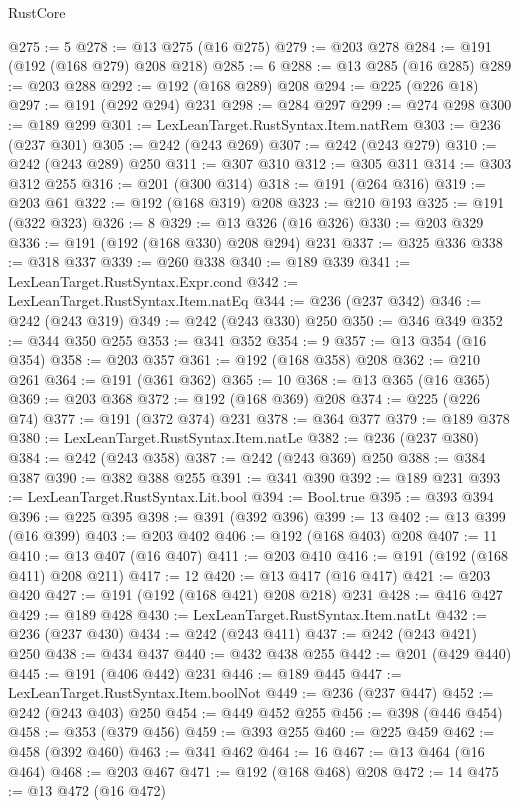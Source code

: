 \begin{lexlean}{RustCore}
\begin{coremodule}
@275 := 5
@278 := @13 @275 (@16 @275)
@279 := @203 @278
@284 := @191 (@192 (@168 @279) @208 @218)
@285 := 6
@288 := @13 @285 (@16 @285)
@289 := @203 @288
@292 := @192 (@168 @289) @208
@294 := @225 (@226 @18)
@297 := @191 (@292 @294) @231
@298 := @284 @297
@299 := @274 @298
@300 := @189 @299
@301 := LexLeanTarget.RustSyntax.Item.natRem
@303 := @236 (@237 @301)
@305 := @242 (@243 @269)
@307 := @242 (@243 @279)
@310 := @242 (@243 @289) @250
@311 := @307 @310
@312 := @305 @311
@314 := @303 @312 @255
@316 := @201 (@300 @314)
@318 := @191 (@264 @316)
@319 := @203 @61
@322 := @192 (@168 @319) @208
@323 := @210 @193
@325 := @191 (@322 @323)
@326 := 8
@329 := @13 @326 (@16 @326)
@330 := @203 @329
@336 := @191 (@192 (@168 @330) @208 @294) @231
@337 := @325 @336
@338 := @318 @337
@339 := @260 @338
@340 := @189 @339
@341 := LexLeanTarget.RustSyntax.Expr.cond
@342 := LexLeanTarget.RustSyntax.Item.natEq
@344 := @236 (@237 @342)
@346 := @242 (@243 @319)
@349 := @242 (@243 @330) @250
@350 := @346 @349
@352 := @344 @350 @255
@353 := @341 @352
@354 := 9
@357 := @13 @354 (@16 @354)
@358 := @203 @357
@361 := @192 (@168 @358) @208
@362 := @210 @261
@364 := @191 (@361 @362)
@365 := 10
@368 := @13 @365 (@16 @365)
@369 := @203 @368
@372 := @192 (@168 @369) @208
@374 := @225 (@226 @74)
@377 := @191 (@372 @374) @231
@378 := @364 @377
@379 := @189 @378
@380 := LexLeanTarget.RustSyntax.Item.natLe
@382 := @236 (@237 @380)
@384 := @242 (@243 @358)
@387 := @242 (@243 @369) @250
@388 := @384 @387
@390 := @382 @388 @255
@391 := @341 @390
@392 := @189 @231
@393 := LexLeanTarget.RustSyntax.Lit.bool
@394 := Bool.true
@395 := @393 @394
@396 := @225 @395
@398 := @391 (@392 @396)
@399 := 13
@402 := @13 @399 (@16 @399)
@403 := @203 @402
@406 := @192 (@168 @403) @208
@407 := 11
@410 := @13 @407 (@16 @407)
@411 := @203 @410
@416 := @191 (@192 (@168 @411) @208 @211)
@417 := 12
@420 := @13 @417 (@16 @417)
@421 := @203 @420
@427 := @191 (@192 (@168 @421) @208 @218) @231
@428 := @416 @427
@429 := @189 @428
@430 := LexLeanTarget.RustSyntax.Item.natLt
@432 := @236 (@237 @430)
@434 := @242 (@243 @411)
@437 := @242 (@243 @421) @250
@438 := @434 @437
@440 := @432 @438 @255
@442 := @201 (@429 @440)
@445 := @191 (@406 @442) @231
@446 := @189 @445
@447 := LexLeanTarget.RustSyntax.Item.boolNot
@449 := @236 (@237 @447)
@452 := @242 (@243 @403) @250
@454 := @449 @452 @255
@456 := @398 (@446 @454)
@458 := @353 (@379 @456)
@459 := @393 @255
@460 := @225 @459
@462 := @458 (@392 @460)
@463 := @341 @462
@464 := 16
@467 := @13 @464 (@16 @464)
@468 := @203 @467
@471 := @192 (@168 @468) @208
@472 := 14
@475 := @13 @472 (@16 @472)

\end{coremodule}
\end{lexlean}
